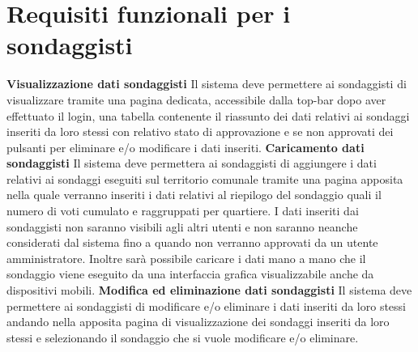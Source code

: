     \section{Requisiti funzionali per i sondaggisti}
        \begin{rfList}
            \rfItem \textbf{Visualizzazione dati sondaggisti} Il sistema deve permettere ai sondaggisti di visualizzare tramite una pagina dedicata, accessibile dalla top-bar dopo aver effettuato il login, una tabella contenente il riassunto dei dati relativi ai sondaggi inseriti da loro stessi con relativo stato di approvazione e se non approvati dei pulsanti per eliminare e/o modificare i dati inseriti. 
            \rfItem \textbf{Caricamento dati sondaggisti} Il sistema deve permettera ai sondaggisti di aggiungere i dati relativi ai sondaggi eseguiti sul territorio comunale tramite una pagina apposita nella quale verranno inseriti i dati relativi al riepilogo del sondaggio quali il numero di voti cumulato e raggruppati per quartiere. I dati inseriti dai sondaggisti non saranno visibili agli altri utenti e non saranno neanche considerati dal sistema fino a quando non verranno approvati da un utente amministratore. Inoltre sarà possibile caricare i dati mano a mano che il sondaggio viene eseguito da una interfaccia grafica visualizzabile anche da dispositivi mobili.
            \rfItem \textbf{Modifica ed eliminazione dati sondaggisti} Il sistema deve permettere ai sondaggisti di modificare e/o eliminare i dati inseriti da loro stessi andando nella apposita pagina di visualizzazione dei sondaggi inseriti da loro stessi e selezionando il sondaggio che si vuole modificare e/o eliminare. 
        \end{rfList}
